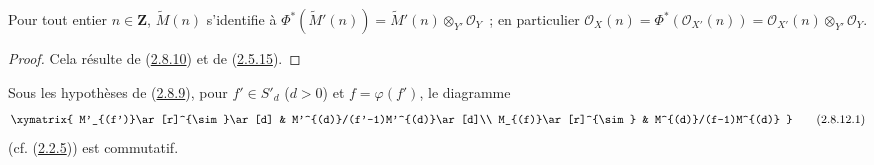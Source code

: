 \begin{corollary}[2.8.11]
\label{II.2.8.11-fr}
Pour tout entier $n\in\mathbf{Z}$, $\widetilde{M}(n)$ s'identifie à
$\Phi^*(\widetilde{M}'(n))=\widetilde{M}'(n)\otimes_{Y'}\mathcal{O}_Y$~;
en particulier
$\mathcal{O}_X(n)=\Phi^*(\mathcal{O}_{X'}(n))
=\mathcal{O}_{X'}(n)\otimes_{Y'}\mathcal{O}_Y$.
\end{corollary}

\begin{proof}
Cela résulte de (\hyperref[II.2.8.10-fr]{2.8.10}) et de
(\hyperref[II.2.5.15-fr]{2.5.15}).
\end{proof}


\begin{env}[2.8.12]
\label{II.2.8.12-fr}
Sous les hypothèses de (\hyperref[II.2.8.9-fr]{2.8.9}), pour
$f'\in S'_d$ ($d>0$) et $f=\varphi(f')$, le diagramme
\[
\label{II.2.8.12.1-fr}
  \xymatrix{
    M'_{(f')}\ar[r]^{\sim}\ar[d]
    & M'^{(d)}/(f'-1)M'^{(d)}\ar[d]\\
    M_{(f)}\ar[r]^{\sim}
    & M^{(d)}/(f-1)M^{(d)}
  }
\tag{2.8.12.1}
\]
(cf. (\hyperref[II.2.2.5-fr]{2.2.5})) est commutatif.
\end{env}

